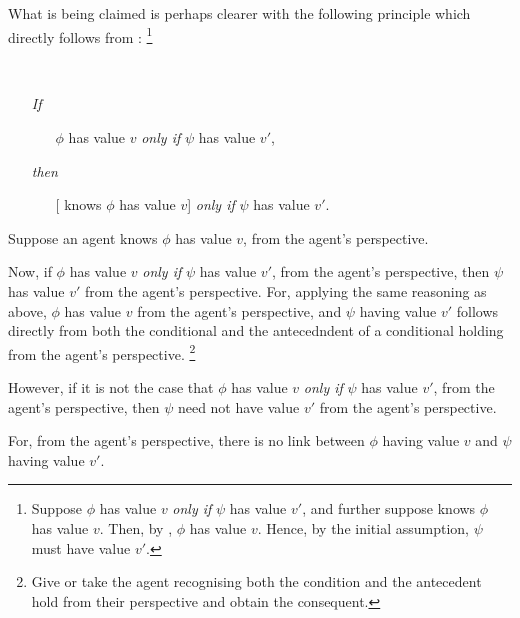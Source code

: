 \begin{note}[Elaboration]
  What is being claimed is perhaps clearer with the following principle which directly follows from \factivity{}:%
  \footnote{
    Suppose \(\phi\) has value \(v\) \emph{only if} \(\psi\) has value \(v'\), and further suppose \vAgent{} knows \(\phi\) has value \(v\).
    Then, by \factivity{}, \(\phi\) has value \(v\).
    Hence, by the initial assumption, \(\psi\) must have value \(v'\).
  }

  \begin{principle}
    \mbox{ }
    \vspace{-\baselineskip}
    \label{principle:tsf}
    \begin{itemize}[noitemsep]
    \item[\emph{If}]
      \begin{itemize}
      \item[]
        \(\phi\) has value \(v\) \emph{only if} \(\psi\) has value \(v'\),
      \end{itemize}
    \item[\emph{then}]
      \begin{itemize}
      \item[]
        [\vAgent{} knows \(\phi\) has value \(v\)] \emph{only if} \(\psi\) has value \(v'\).
      \end{itemize}
    \end{itemize}
    \vspace{-\baselineskip}
  \end{principle}

  Suppose an agent knows \(\phi\) has value \(v\), from the agent's perspective.

  Now, if \(\phi\) has value \(v\) \emph{only if} \(\psi\) has value \(v'\), from the agent's perspective, then \(\psi\) has value \(v'\) from the agent's perspective.
  For, applying the same reasoning as above, \(\phi\) has value \(v\) from the agent's perspective, and \(\psi\) having value \(v'\) follows directly from both the conditional and the antecedndent of a conditional holding from the agent's perspective.%
  \footnote{
    Give or take the agent recognising both the condition and the antecedent hold from their perspective and obtain the consequent.
  }

  However, if it is not the case that \(\phi\) has value \(v\) \emph{only if} \(\psi\) has value \(v'\), from the agent's perspective, then \(\psi\) need not have value \(v'\) from the agent's perspective.

  For, from the agent's perspective, there is no link between \(\phi\) having value \(v\) and \(\psi\) having value \(v'\).
\end{note}

